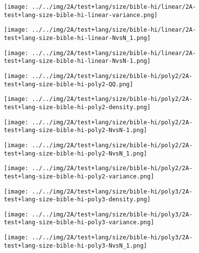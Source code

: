 \begin{figure}[H]
\centering	\texttt{[image: ../../img/2A/test+lang/size/bible-hi/linear/2A-test+lang-size-bible-hi-linear-variance.png]}
\end{figure}
\begin{figure}[H]
\centering	\texttt{[image: ../../img/2A/test+lang/size/bible-hi/linear/2A-test+lang-size-bible-hi-linear-NvsN\_1.png]}
\end{figure}
\begin{figure}[H]
\centering	\texttt{[image: ../../img/2A/test+lang/size/bible-hi/linear/2A-test+lang-size-bible-hi-linear-NvsN-1.png]}
\end{figure}
\begin{figure}[H]
\centering	\texttt{[image: ../../img/2A/test+lang/size/bible-hi/poly2/2A-test+lang-size-bible-hi-poly2-QQ.png]}
\end{figure}
\begin{figure}[H]
\centering	\texttt{[image: ../../img/2A/test+lang/size/bible-hi/poly2/2A-test+lang-size-bible-hi-poly2-density.png]}
\end{figure}
\begin{figure}[H]
\centering	\texttt{[image: ../../img/2A/test+lang/size/bible-hi/poly2/2A-test+lang-size-bible-hi-poly2-NvsN-1.png]}
\end{figure}
\begin{figure}[H]
\centering	\texttt{[image: ../../img/2A/test+lang/size/bible-hi/poly2/2A-test+lang-size-bible-hi-poly2-NvsN\_1.png]}
\end{figure}
\begin{figure}[H]
\centering	\texttt{[image: ../../img/2A/test+lang/size/bible-hi/poly2/2A-test+lang-size-bible-hi-poly2-variance.png]}
\end{figure}
\begin{figure}[H]
\centering	\texttt{[image: ../../img/2A/test+lang/size/bible-hi/poly3/2A-test+lang-size-bible-hi-poly3-density.png]}
\end{figure}
\begin{figure}[H]
\centering	\texttt{[image: ../../img/2A/test+lang/size/bible-hi/poly3/2A-test+lang-size-bible-hi-poly3-variance.png]}
\end{figure}
\begin{figure}[H]
\centering	\texttt{[image: ../../img/2A/test+lang/size/bible-hi/poly3/2A-test+lang-size-bible-hi-poly3-NvsN\_1.png]}
\end{figure}
